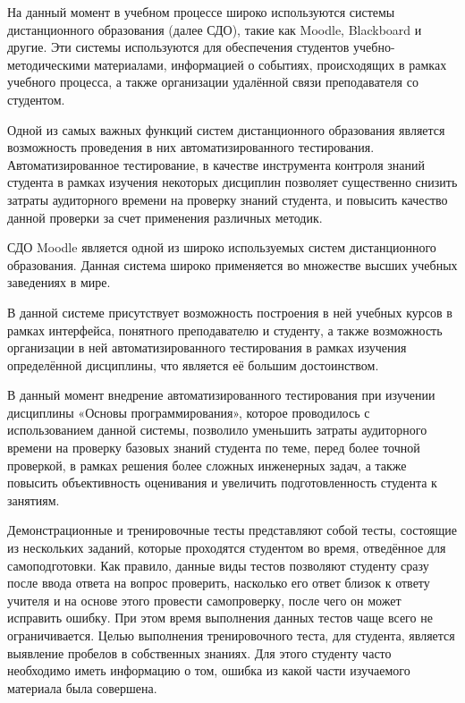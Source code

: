 \documentclass[a4paper,english,russian]{G2-105}
\begin{document}
\par На данный момент в учебном процессе широко используются системы дистанционного
образования (далее СДО), такие как Moodle, Blackboard и другие. Эти системы
используются для обеспечения студентов учебно-методическими материалами,
информацией о событиях, происходящих в рамках учебного процесса, а также
организации удалённой связи преподавателя со студентом.
\par Одной из самых важных функций систем дистанционного образования является
возможность проведения в них автоматизированного тестирования. Автоматизированное
 тестирование, в качестве инструмента контроля знаний студента в рамках изучения
 некоторых дисциплин позволяет существенно снизить затраты аудиторного времени
 на проверку знаний студента, и повысить качество данной проверки за счет
 применения различных методик.
\par СДО Moodle является одной из широко используемых систем дистанционного
образования. Данная система широко применяется  во множестве высших учебных
заведениях в мире.
\par В данной системе присутствует возможность построения в ней учебных курсов
в рамках интерфейса, понятного преподавателю и студенту, а также возможность
организации в ней автоматизированного тестирования в рамках изучения
определённой дисциплины, что является её большим достоинством.
\par В данный момент внедрение автоматизированного тестирования при изучении
дисциплины «Основы программирования», которое проводилось с использованием
данной системы, позволило уменьшить затраты аудиторного времени на  проверку
базовых знаний студента по теме, перед более точной проверкой, в рамках решения
более сложных инженерных задач, а также повысить объективность оценивания и
увеличить подготовленность студента к занятиям.
\par Демонстрационные и тренировочные тесты представляют собой тесты, состоящие
из нескольких заданий, которые проходятся  студентом во время, отведённое для
самоподготовки. Как правило, данные виды тестов позволяют студенту сразу после
ввода ответа  на вопрос проверить, насколько его ответ близок к  ответу учителя
и на основе этого провести самопроверку, после чего он может исправить ошибку.
При этом время выполнения данных тестов чаще всего не ограничивается.
Целью выполнения тренировочного теста, для студента, является выявление пробелов
 в собственных знаниях. Для этого студенту часто  необходимо иметь информацию о
том, ошибка из какой части изучаемого материала была совершена.
\end{document}
